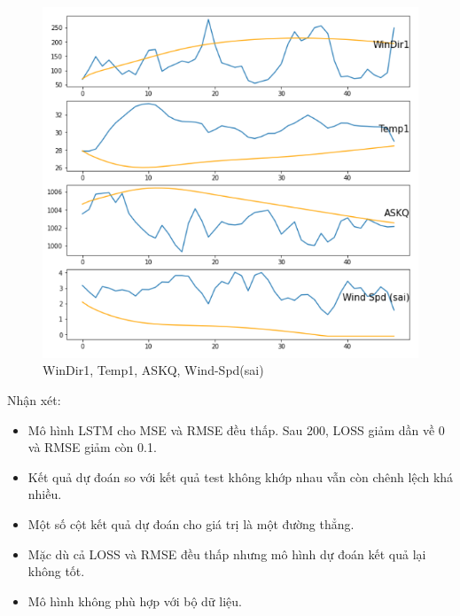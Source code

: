 \begin{figure}[H]
    \centering
    \includegraphics[width=1\textwidth]{figures/LSTM_test5.png}
    \caption[WinDir1, Temp1, ASKQ, Wind-Spd(sai)]{WinDir1, Temp1, ASKQ, Wind-Spd(sai)}
\end{figure}
Nhận xét:
\begin{itemize}
    \item Mô hình LSTM cho MSE và RMSE đều thấp. Sau 200, LOSS giảm dần về 0 và RMSE giảm còn 0.1.
    \item Kết quả dự đoán so với kết quả test không khớp nhau vẫn còn chênh lệch khá nhiều.
    \item Một số cột kết quả dự đoán cho giá trị là một đường thẳng.
    \item Mặc dù cả LOSS và RMSE đều thấp nhưng mô hình dự đoán kết quả lại không tốt.
    \item Mô hình không phù hợp với bộ dữ liệu.
\end{itemize}
\newpage

